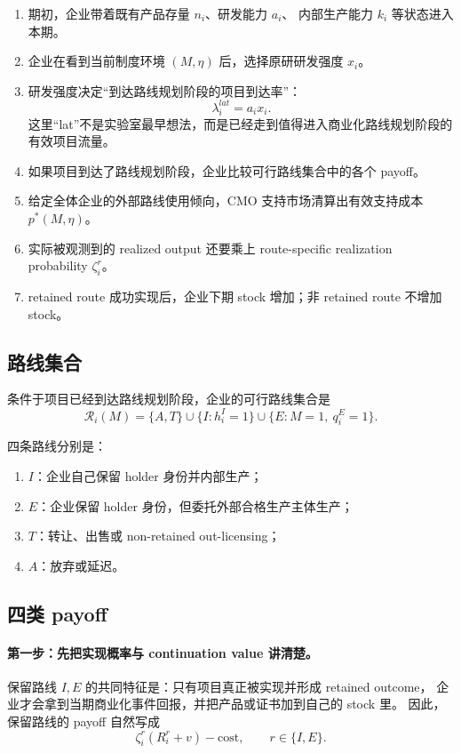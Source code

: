 \documentclass[12pt,UTF8]{ctexart}
\newcommand{\Rset}{\mathcal{R}}
\theoremstyle{plain}
\theoremstyle{remark}
\begin{document}
\begin{enumerate}[leftmargin=2em]
    \item 期初，企业带着既有产品存量 $n_i$、研发能力 $a_i$、
    内部生产能力 $k_i$ 等状态进入本期。
    \item 企业在看到当前制度环境 $(M,\eta)$ 后，选择原研研发强度 $x_i$。
    \item 研发强度决定“到达路线规划阶段的项目到达率”：
    \[
    \lambda_i^{lat}=a_i x_i.
    \]
    这里“lat”不是实验室最早想法，而是已经走到值得进入商业化路线规划阶段的
    有效项目流量。
    \item 如果项目到达了路线规划阶段，企业比较可行路线集合中的各个 payoff。
    \item 给定全体企业的外部路线使用倾向，CMO 支持市场清算出有效支持成本
    $p^*(M,\eta)$。
    \item 实际被观测到的 realized output 还要乘上 route-specific
    realization probability $\zeta_i^r$。
    \item retained route 成功实现后，企业下期 stock 增加；非 retained
    route 不增加 stock。
\end{enumerate}

\subsection{路线集合}

条件于项目已经到达路线规划阶段，企业的可行路线集合是
\begin{equation}
\Rset_i(M)=
\{A,T\}\cup \{I:h_i^I=1\}\cup \{E:M=1,\ q_i^E=1\}.
\label{eq:route_set}
\end{equation}

四条路线分别是：

\begin{enumerate}[leftmargin=2em]
    \item $I$：企业自己保留 holder 身份并内部生产；
    \item $E$：企业保留 holder 身份，但委托外部合格生产主体生产；
    \item $T$：转让、出售或 non-retained out-licensing；
    \item $A$：放弃或延迟。
\end{enumerate}

\subsection{四类 payoff}

\paragraph{第一步：先把实现概率与 continuation value 讲清楚。}
保留路线 $I,E$ 的共同特征是：只有项目真正被实现并形成 retained outcome，
企业才会拿到当期商业化事件回报，并把产品或证书加到自己的 stock 里。
因此，保留路线的 payoff 自然写成
\[
\zeta_i^r(R_i^r+v)-\text{cost},
\qquad r\in\{I,E\}.
\]
\end{document}
